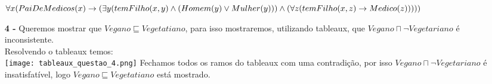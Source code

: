 \documentclass[12pt]{article}
\begin{document}
\begin{itemize}
			\begin{footnotesize}
			$\forall x( PaiDeMedicos(x) \rightarrow \\ (\exists y(temFilho(x, y) \wedge (Homem(y) \vee Mulher(y))) \wedge (\forall z (temFilho(x, z) \rightarrow Medico(z)))))$
			\end{footnotesize}			
		\item[\textbf{4 -}]
			\hfill\newline
			Queremos mostrar que $Vegano \sqsubseteq Vegetatiano$, para isso mostraremos,
			utilizando tableaux, que $Vegano \sqcap \neg Vegetariano$ é inconsistente.\\
			Resolvendo o tableaux temos:\\
			\texttt{[image: tableaux\_questao\_4.png]}
			Fechamos todos os ramos do tableaux com uma contradição, por isso
			$Vegano \sqcap \neg Vegetariano$ é insatisfatível, logo $Vegano \sqsubseteq Vegetatiano$ 
			está mostrado.
	\end{itemize}
\end{document}
